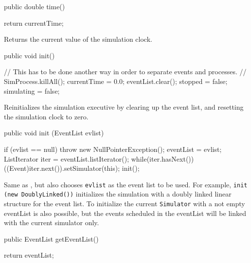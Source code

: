\begin{code}

   public double time() \begin{hide}
   {
      return currentTime;
   }\end{hide}
\end{code}
   \begin{tabb} Returns the current value of the simulation clock. \end{tabb}
\begin{htmlonly}
\end{htmlonly}
\begin{code}

   public void init() \begin{hide} {
     // This has to be done another way in order to separate events and processes.
//      SimProcess.killAll();
      currentTime = 0.0;   eventList.clear();   stopped = false;  simulating = false;
   }\end{hide}
\end{code}
  \begin{tabb} Reinitializes the simulation executive by clearing up the event
   list, and resetting the simulation clock to zero.
  \end{tabb}
\begin{code}

   public void init (EventList evlist) \begin{hide} {
      if (evlist == null)
         throw new NullPointerException();
      eventList = evlist;
      ListIterator iter = eventList.listIterator();
      while(iter.hasNext())
         ((Event)iter.next()).setSimulator(this);
      init();
   }\end{hide}
\end{code}
  \begin{tabb} Same as , but also chooses \texttt{evlist} as the
    event list to be used.
    For example, \texttt{init (new DoublyLinked())} initializes the simulation
    with a doubly linked linear structure for the event list. To initialize the
    current \texttt{Simulator} with a not empty eventList is also possible, but
    the events scheduled in the eventList will be linked with the current simulator only.
  \end{tabb}
\begin{htmlonly}
\end{htmlonly}
\begin{code}

   public EventList getEventList()\begin{hide} {
      return eventList;
   }\end{hide}
\end{code}
